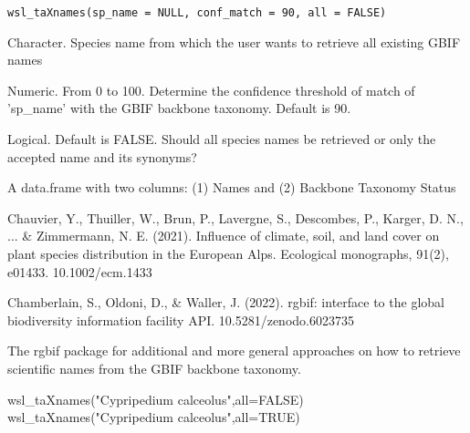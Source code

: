 \documentclass[a4paper]{book}
\begin{document}
%
\begin{Usage}
\begin{verbatim}
wsl_taXnames(sp_name = NULL, conf_match = 90, all = FALSE)
\end{verbatim}
\end{Usage}
%
\begin{Arguments}
\begin{ldescription}
\item[\code{sp\_name}] Character. Species name from which the user wants to retrieve all existing GBIF names

\item[\code{conf\_match}] Numeric. From 0 to 100. Determine the confidence
threshold of match of 'sp\_name' with the GBIF backbone taxonomy. Default is 90.

\item[\code{all}] Logical. Default is FALSE. Should all species names be retrieved or only
the accepted name and its synonyms?
\end{ldescription}
\end{Arguments}
%
\begin{Value}
A data.frame with two columns: (1) Names and (2) Backbone Taxonomy Status
\end{Value}
%
\begin{References}\relax
Chauvier, Y., Thuiller, W., Brun, P., Lavergne, S., Descombes, P., Karger, D. N., ... \& Zimmermann,
N. E. (2021). Influence of climate, soil, and land cover on plant species distribution in the
European Alps. Ecological monographs, 91(2), e01433. 10.1002/ecm.1433

Chamberlain, S., Oldoni, D., \& Waller, J. (2022). rgbif: interface to the global biodiversity
information facility API. 10.5281/zenodo.6023735
\end{References}
%
\begin{SeeAlso}\relax
The rgbif package for additional and more general approaches on how to retrieve
scientific names from the GBIF backbone taxonomy.
\end{SeeAlso}
%
\begin{Examples}
\begin{ExampleCode}
wsl_taXnames("Cypripedium calceolus",all=FALSE)
wsl_taXnames("Cypripedium calceolus",all=TRUE)

\end{ExampleCode}
\end{Examples}
\printindex{}
\end{document}
